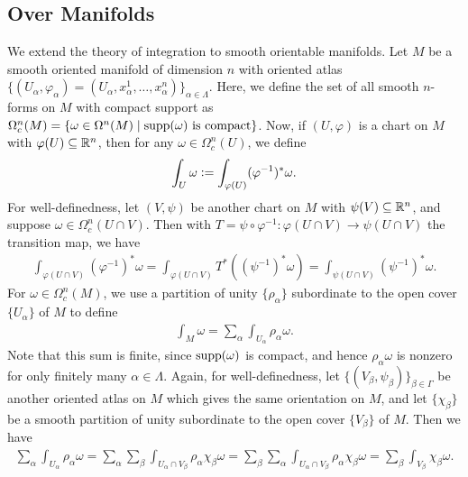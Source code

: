\subsection{Over Manifolds}
We extend the theory of integration to smooth orientable manifolds. Let $M$ be a smooth oriented manifold of dimension $n$ with oriented atlas $\{(U_{\alpha},\varphi_{\alpha}) = (U_{\alpha},x^{1}_{\alpha},\ldots,x^{n}_{\alpha})\}_{\alpha \in \Lambda}$. Here, we define the set of all smooth $n$-forms on $M$ with compact support as $\Omega^{n}_{c}(M) = \{\omega \in \Omega^{n}(M) \mid \operatorname{supp}(\omega) \text{ is compact}\}$. Now, if $(U,\varphi)$ is a chart on $M$ with $\varphi(U) \subseteq \mathbb{R}^{n}$, then for any $\omega \in \Omega^{n}_{c}(U)$, we define
\begin{align}
    \int_{U} \omega \vcentcolon= \int_{\varphi(U)} (\varphi^{-1})^{\ast}\omega.
\end{align}
For well-definedness, let $(V,\psi)$ be another chart on $M$ with $\psi(V) \subseteq \mathbb{R}^{n}$, and suppose $\omega \in \Omega^{n}_{c}(U \cap V)$. Then with $T = \psi \circ \varphi^{-1}:\varphi(U \cap V) \to \psi(U \cap V)$ the transition map, we have
\begin{align}
    \int_{\varphi(U \cap V)} (\varphi^{-1})^{\ast}\omega = \int_{\varphi(U \cap V)} T^{\ast}((\psi^{-1})^{\ast}\omega) = \int_{\psi(U \cap V)} (\psi^{-1})^{\ast}\omega.
\end{align}
For $\omega \in \Omega^{n}_{c}(M)$, we use a partition of unity $\{\rho_{\alpha}\}$ subordinate to the open cover $\{U_{\alpha}\}$ of $M$ to define
\begin{align}
    \int_{M} \omega = \sum_{\alpha} \int_{U_{\alpha}} \rho_{\alpha}\omega.
\end{align}
Note that this sum is finite, since $\operatorname{supp}(\omega)$ is compact, and hence $\rho_{\alpha}\omega$ is nonzero for only finitely many $\alpha \in \Lambda$. Again, for well-definedness, let $\{(V_{\beta},\psi_{\beta})\}_{\beta \in \Gamma}$ be another oriented atlas on $M$ which gives the same orientation on $M$, and let $\{\chi_{\beta}\}$ be a smooth partition of unity subordinate to the open cover $\{V_{\beta}\}$ of $M$. Then we have
\begin{align}
    \sum_{\alpha} \int_{U_{\alpha}} \rho_{\alpha} \omega = \sum_{\alpha} \sum_{\beta} \int_{U_{\alpha} \cap V_{\beta}} \rho_{\alpha}\chi_{\beta}\omega = \sum_{\beta} \sum_{\alpha} \int_{U_{\alpha} \cap V_{\beta}} \rho_{\alpha}\chi_{\beta}\omega = \sum_{\beta} \int_{V_{\beta}} \chi_{\beta}\omega.
\end{align}

